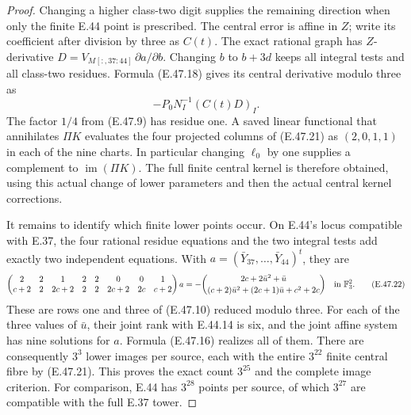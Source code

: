 \begin{proof}
Changing a higher class-two digit supplies the
remaining direction when only the finite E.44
point is prescribed.  The central error is
affine in $Z$; write its coefficient after
division by three as $C(t)$.  The exact rational
graph has $Z$-derivative
$D=V_M{}_{[:,37:44]}\,\partial a/\partial b$.
Changing $b$ to $b+3d$ keeps all integral tests
and all class-two residues.  Formula
\textup{(E.47.18)} gives its central derivative
modulo three as
\[
                   -P_0N_I^{-1}(C(t)D)_I.
 \tag{E.47.21}
\]
The factor $1/4$ from \textup{(E.47.9)} has
residue one.  A saved linear functional that
annihilates $\Pi K$ evaluates the four projected
columns of \textup{(E.47.21)} as $(2,0,1,1)$
in each of the nine charts.  In particular
changing $\ell_0$ by one supplies a complement
to $\operatorname{im}(\Pi K)$.  The full finite
central kernel is therefore obtained, using
this actual change of lower parameters and
then the actual central kernel corrections.

It remains to identify which finite lower
points occur.  On E.44's locus compatible
with E.37, the four rational residue equations
and the two integral tests add exactly two
independent equations.  With
$a=(\bar Y_{37},\ldots,\bar Y_{44})^t$, they are
\[
 \begin{pmatrix}
 2&2&1&2&2&0&0&1\\
 c+2&2&2c+2&2&2&2c+2&2c&c+2
 \end{pmatrix}a
 =-\binom{2c+2\bar u^2+\bar u}
 {(c+2)\bar u^2+(2c+1)\bar u+c^2+2c}
                   \quad\hbox{in }\mathbb F_3^2.
 \tag{E.47.22}
\]
These are rows one and three of
\textup{(E.47.10)} reduced modulo three.
For each of the three values of $\bar u$,
their joint rank with E.44.14 is six, and the
joint affine system has nine solutions for
$a$.  Formula \textup{(E.47.16)} realizes all
of them.  There are consequently $3^3$ lower
images per source, each with the entire
$3^{22}$ finite central fibre by
\textup{(E.47.21)}.  This proves the exact
count $3^{25}$ and the complete image criterion.
For comparison, E.44 has $3^{28}$ points per
source, of which $3^{27}$ are compatible with
the full E.37 tower.


\end{proof}
